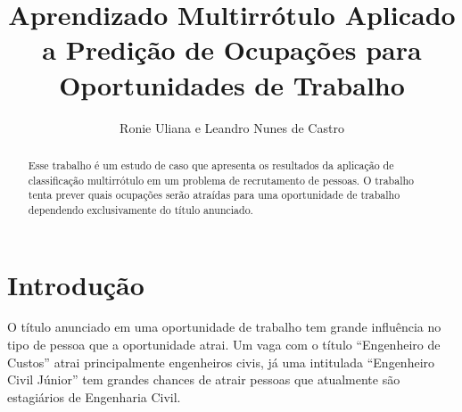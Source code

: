 \documentclass[runningheads,a4paper]{llncs}
\begin{document}


\title{Aprendizado Multirrótulo Aplicado a Predição de Ocupações para Oportunidades de Trabalho}
{}

\author{
	Ronie Uliana e Leandro Nunes de Castro
}

%

			
\maketitle

\begin{abstract}
Esse trabalho é um estudo de caso que apresenta os resultados da aplicação de classificação multirrótulo em um problema de recrutamento de pessoas. O trabalho tenta prever quais ocupações serão atraídas para uma oportunidade de trabalho dependendo exclusivamente do título anunciado.
\end{abstract}


\section{Introdução} \label{sec:intro}

O título anunciado em uma oportunidade de trabalho tem grande influência no tipo de pessoa que a oportunidade atrai. Um vaga com o título \enquote{Engenheiro de Custos} atrai principalmente engenheiros civis, já uma intitulada \enquote{Engenheiro Civil Júnior} tem grandes chances de atrair pessoas que atualmente são estagiários de Engenharia Civil.
\end{document}
